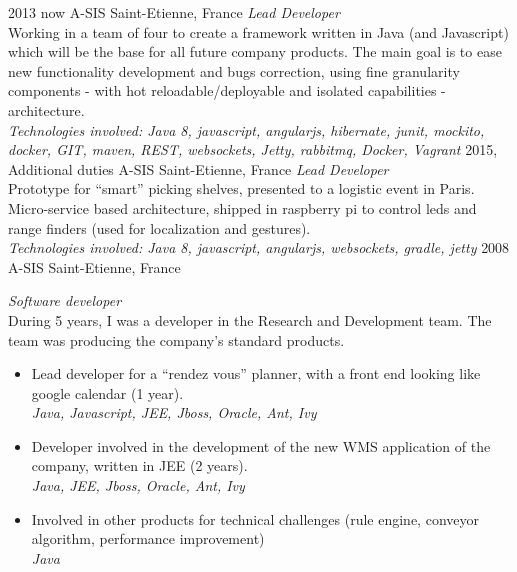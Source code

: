 \documentclass[]{k-cv} %
\begin{document}
\begin{entrylist}
\entry
{2013 \to now}
{A-SIS}
{Saint-Etienne, France}
{\emph{Lead Developer} \\
Working in a team of four to create a framework written in Java (and Javascript) which
 will be the base for all future company products.
The main goal is to ease new functionality development and bugs correction,
  using fine granularity components - with hot reloadable/deployable and isolated capabilities - architecture. \\
\emph{
Technologies involved:
Java 8, javascript, angularjs, hibernate, junit, mockito, docker,
GIT, maven, REST, websockets, Jetty, rabbitmq, Docker, Vagrant
}}
\entry
{2015, Additional duties}
{A-SIS}
{Saint-Etienne, France}
{\emph{Lead Developer} \\
Prototype for “smart” picking shelves, presented to a logistic event in Paris.
Micro-service based architecture, shipped in raspberry pi to control leds and range finders
(used for localization and gestures). \\
\emph{
Technologies involved:
Java 8, javascript, angularjs, websockets,  gradle, jetty
}}
\entry
{2008 }
{A-SIS}
{Saint-Etienne, France}
{\emph{Software developer} \\
During 5 years, I was a developer in the Research and Development team.
The team was producing the company’s standard products.
\begin{itemize}
\item
Lead developer for a “rendez vous” planner, with a front end looking like google calendar (1 year). \\
\emph{Java, Javascript, JEE, Jboss, Oracle, Ant, Ivy}
\item
Developer involved in the development of the new WMS application of the company, written in JEE (2 years). \\
\emph{Java, JEE, Jboss, Oracle, Ant, Ivy}
\item
Involved in other products for technical challenges (rule engine, conveyor algorithm, performance improvement) \\
\emph{Java}
\end{itemize}}

\end{entrylist}

\clearpage
\end{document}
